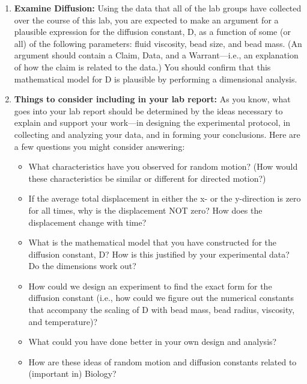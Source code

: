 \begin{enumerate}
\item \textbf{Examine Diffusion:} Using the data that all of the lab groups have collected over the course of this lab, you are expected to make an argument for a plausible expression for the diffusion constant, D, as a function of some (or all) of the following parameters: fluid viscosity, bead size, and bead mass. (An argument should contain a Claim, Data, and a Warrant—i.e., an explanation of how the claim is related to the data.) You should confirm that this mathematical model for D is plausible by performing a dimensional analysis.
\item \textbf{Things to consider including in your lab report:} As you know, what goes into your lab report should be determined by the ideas necessary to explain and support your work—in designing the experimental protocol, in collecting and analyzing your data, and in forming your conclusions. Here are a few questions you might consider answering:
\begin{itemize}
\item What characteristics have you observed for random motion? (How would these characteristics be similar or different for directed motion?)
\item If the average total displacement in either the x- or the y-direction is zero for all times, why is the displacement NOT zero? How does the displacement change with time?
\item What is the mathematical model that you have constructed for the diffusion constant, D? How is this justified by your experimental data? Do the dimensions work out?
\item How could we design an experiment to find the exact form for the diffusion constant (i.e., how could we figure out the numerical constants that accompany the scaling of D with bead mass, bead radius, viscosity, and temperature)?
\item What could you have done better in your own design and analysis?
\item How are these ideas of random motion and diffusion constants related to (important in) Biology?
\end{itemize}
\end{enumerate}

